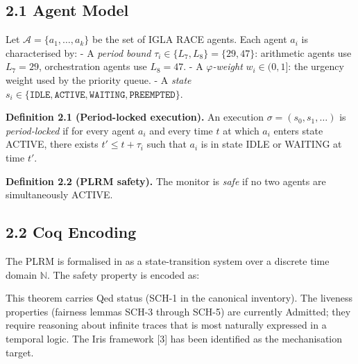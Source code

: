 \subsection{2.1 Agent Model}\label{fa_24:agent-model}

Let \(\mathcal{A} = \{a_1, \ldots, a_k\}\) be the
set of IGLA RACE agents. Each agent \(a_i\) is
characterised by: - A \emph{period bound}
\(\tau_i \in \{L_7, L_8\} = \{29, 47\}\):
arithmetic agents use \(L_7 = 29\), orchestration
agents use \(L_8 = 47\). - A
\emph{\(\varphi\)-weight} \(w_i \in (0, 1]\): the
urgency weight used by the priority queue. - A
\emph{state}
\(s_i \in \{\texttt{IDLE}, \texttt{ACTIVE}, \texttt{WAITING}, \texttt{PREEMPTED}\}\).

\textbf{Definition 2.1 (Period-locked execution).}
An execution \(\sigma = (s_0, s_1, \ldots)\) is
\emph{period-locked} if for every agent \(a_i\)
and every time \(t\) at which \(a_i\) enters state
ACTIVE, there exists \(t' \leq t + \tau_i\) such
that \(a_i\) is in state IDLE or WAITING at time
\(t'\).

\textbf{Definition 2.2 (PLRM safety).} The monitor
is \emph{safe} if no two agents are simultaneously
ACTIVE.

\subsection{2.2 Coq
Encoding}\label{fa_24:coq-encoding}

The PLRM is formalised in
 as a
state-transition system over a discrete time
domain \(\mathbb{N}\). The safety property is
encoded as:

\begin{Shaded}
\begin{Highlighting}[]
\end{Highlighting}
\end{Shaded}

This theorem carries Qed status (SCH-1 in the
canonical inventory). The liveness properties
(fairness lemmas SCH-3 through SCH-5) are
currently Admitted; they require reasoning about
infinite traces that is most naturally expressed
in a temporal logic. The Iris framework [3]
has been identified as the mechanisation target.

